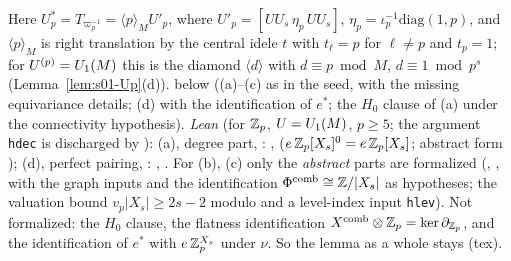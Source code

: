 \begin{lemma}
Here $U_p^*=T_{\varpi_p^{-1}}=\langle p\rangle_MU'_p$, where $U'_p=[UU_s\,\eta_p\,UU_s]$, $\eta_p=\iota_p^{-1}\mathrm{diag}(1,p)$, and
$\langle p\rangle_M$ is right translation by the central idele $t$ with $t_\ell=p$ for $\ell\ne p$ and $t_p=1$; for
$U^{(p)}=U_1(M)$ this is the diamond $\langle d\rangle$ with $d\equiv p\bmod M$, $d\equiv1\bmod p^s$ (Lemma~\ref{lem:s01-Up}(d)).
\stproved{} below ((a)--(c) as in the seed, with the missing equivariance details; (d) with the identification of $e^*$; the
$H_0$ clause of (a) under the connectivity hypothesis). \emph{Lean} (for $\mathbb{Z}_p$, $U=U_1(M)$, $p\ge5$; the argument \texttt{hdec} is discharged by
): (a), degree part, \stformal: ,
 ($e\,\mathbb{Z}_p[X_s]^0=e\,\mathbb{Z}_p[X_s]$; abstract form ); (d), perfect pairing,
\stformal: , . For (b), (c) only
the \emph{abstract} parts are formalized (, , with the
graph inputs and the identification $\Phi^{\mathrm{comb}}\cong\mathbb{Z}/|X_s|$ as hypotheses; the valuation bound $v_p|X_s|\ge2s-2$ modulo  and a level-index input
\texttt{hlev}). Not formalized: the $H_0$ clause, the flatness identification $X^{\mathrm{comb}}\otimes\mathbb{Z}_p=\ker\partial_{\mathbb{Z}_p}$, and the identification of $e^*$ with $e\,\mathbb{Z}_p^{X_s}$
under $\nu$. So the lemma as a whole stays \stproved{} (tex).
\end{lemma}
